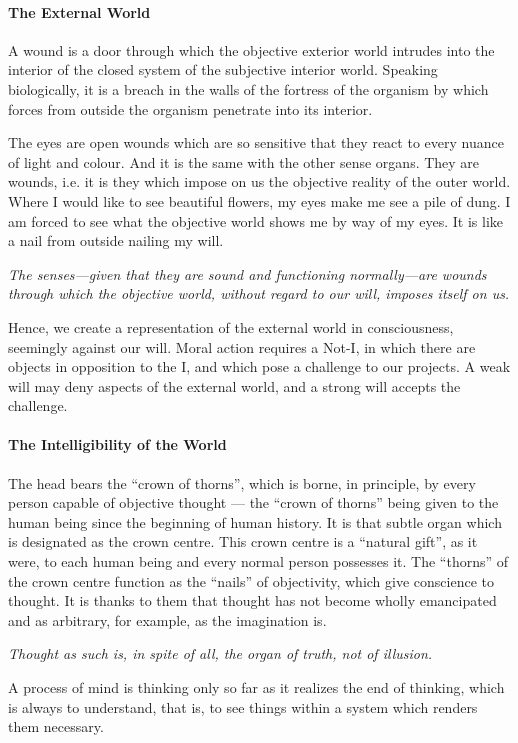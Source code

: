 \paragraph{The External World}


\begin{quotationx}
A wound is a door through which the objective exterior world intrudes into the interior of the closed system of the subjective interior world. Speaking biologically, it is a breach in the walls of the fortress of the organism by which forces from outside the organism penetrate into its interior.

The eyes are open wounds which are so sensitive that they react to every nuance of light and colour. And it is the same with the other sense organs. They are wounds, i.e. it is they which impose on us the objective reality of the outer world. Where I would like to see beautiful flowers, my eyes make me see a pile of dung. I am forced to see what the objective world shows me by way of my eyes. It is like a nail from outside nailing my will.

\emph{The senses---given that they are sound and functioning normally---are wounds through which the objective world, without regard to our will, imposes itself on us.}
\end{quotationx}


Hence, we create a representation of the external world in consciousness, seemingly against our will. Moral action requires a Not-I, in which there are objects in opposition to the I, and which pose a challenge to our projects. A weak will may deny aspects of the external world, and a strong will accepts the challenge.

\paragraph{The Intelligibility of the World}


\begin{quotationx}
The head bears the ``crown of thorns'', which is borne, in principle, by every person capable of objective thought --- the ``crown of thorns'' being given to the human being since the beginning of human history. It is that subtle organ which is designated as the crown centre. This crown centre is a ``natural gift'', as it were, to each human being and every normal person possesses it. The ``thorns'' of the crown centre function as the ``nails'' of objectivity, which give conscience to thought. It is thanks to them that thought has not become wholly emancipated and as arbitrary, for example, as the imagination is.

\emph{Thought as such is, in spite of all, the organ of truth, not of illusion.}

A process of mind is thinking only so far as it realizes the end of thinking, which is always to understand, that is, to see things within a system which renders them necessary.
\end{quotationx}



